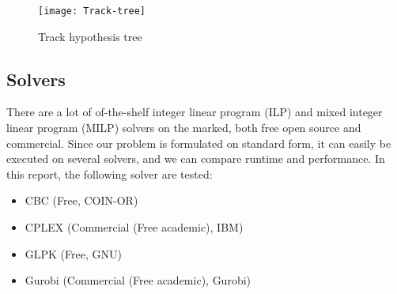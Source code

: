 \begin{figure}
\centering
\texttt{[image: Track-tree]}
\caption{Track hypothesis tree}
\label{fig:hyp-tree}
\end{figure}

\subsection{Solvers}
There are a lot of of-the-shelf integer linear program (ILP) and mixed integer linear program (MILP) solvers on the marked, both free open source and commercial. Since our problem is formulated on standard form, it can easily be executed on several solvers, and we can compare runtime and performance. In this report, the following solver are tested:
\begin{itemize}
\item CBC 		(Free, COIN-OR)
\item CPLEX 	(Commercial (Free academic),  IBM)
\item GLPK 		(Free, GNU)
\item Gurobi 	(Commercial (Free academic), Gurobi)
\end{itemize}

















